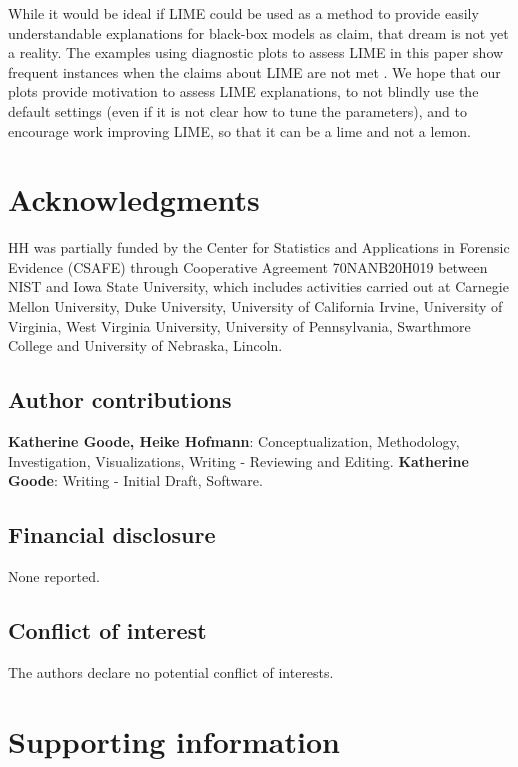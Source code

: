 \documentclass[AMS,STIX2COL]{WileyNJD-v2}\usepackage[]{graphicx}\usepackage[]{color}
\begin{document}
While it would be ideal if LIME could be used as a method to provide easily understandable explanations for black-box models as \citet{ribeiro:2016} claim, that dream is not yet a reality. The examples using diagnostic plots to assess LIME in this paper show frequent instances when the claims about LIME are not met . We hope that our plots provide motivation to assess LIME explanations, to not blindly use the default settings (even if it is not clear how to tune the parameters), and to encourage work  improving LIME, so that it can be a lime and not a lemon.

\section*{Acknowledgments}

HH was partially funded by the Center for Statistics and Applications in Forensic Evidence (CSAFE) through Cooperative Agreement 70NANB20H019 between NIST and Iowa State University, which includes activities carried out at Carnegie Mellon University, Duke University, University of California Irvine, University of Virginia, West Virginia University, University of Pennsylvania, Swarthmore College and University of Nebraska, Lincoln.

\subsection*{Author contributions}

{\bf Katherine Goode, Heike Hofmann}: Conceptualization, Methodology, Investigation, Visualizations, Writing - Reviewing and Editing. {\bf Katherine Goode}: Writing - Initial Draft, Software.

\subsection*{Financial disclosure}

None reported.

\subsection*{Conflict of interest}

The authors declare no potential conflict of interests.

\section*{Supporting information}
\end{document}
